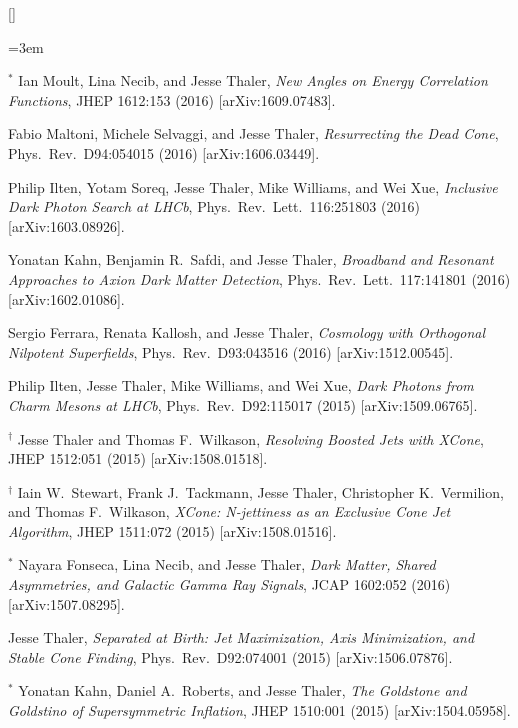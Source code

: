 \begin{list}{[]\addtocounter{jessecount}{-1}}{\leftmargin=3em \itemsep=4pt}
\item
${}^\ast$ Ian Moult, Lina Necib, and Jesse Thaler,
\emph{New Angles on Energy Correlation Functions},
JHEP 1612:153 (2016)
[arXiv:1609.07483].

\item
 Fabio Maltoni, Michele Selvaggi, and Jesse Thaler,
\emph{Resurrecting the Dead Cone},
Phys.\ Rev.\ D94:054015 (2016)
[arXiv:1606.03449].

\item
 Philip Ilten, Yotam Soreq, Jesse Thaler, Mike Williams, and Wei Xue,
\emph{Inclusive Dark Photon Search at LHCb},
Phys.\ Rev.\ Lett.\ 116:251803 (2016)
[arXiv:1603.08926].

\item
 Yonatan Kahn, Benjamin R.\ Safdi, and Jesse Thaler,
\emph{Broadband and Resonant Approaches to Axion Dark Matter Detection},
Phys.\ Rev.\ Lett.\ 117:141801 (2016)
[arXiv:1602.01086].

\item
 Sergio Ferrara, Renata Kallosh, and Jesse Thaler,
\emph{Cosmology with Orthogonal Nilpotent Superfields},
Phys.\ Rev.\ D93:043516 (2016)
[arXiv:1512.00545].

\item
 Philip Ilten, Jesse Thaler, Mike Williams, and Wei Xue,
\emph{Dark Photons from Charm Mesons at LHCb},
Phys.\ Rev.\ D92:115017 (2015)
[arXiv:1509.06765].

\item
${}^\dagger$ Jesse Thaler and Thomas F.\ Wilkason,
\emph{Resolving Boosted Jets with XCone},
JHEP 1512:051 (2015)
[arXiv:1508.01518].

\item
${}^\dagger$ Iain W.\ Stewart, Frank J.\ Tackmann, Jesse Thaler, Christopher K.\ Vermilion, and Thomas F.\ Wilkason,
\emph{XCone: N-jettiness as an Exclusive Cone Jet Algorithm},
JHEP 1511:072 (2015)
[arXiv:1508.01516].

\item
${}^\ast$ Nayara Fonseca, Lina Necib, and Jesse Thaler,
\emph{Dark Matter, Shared Asymmetries, and Galactic Gamma Ray Signals},
JCAP 1602:052 (2016)
[arXiv:1507.08295].

\item
 Jesse Thaler,
\emph{Separated at Birth: Jet Maximization, Axis Minimization, and Stable Cone Finding},
Phys.\ Rev.\ D92:074001 (2015)
[arXiv:1506.07876].

\item
${}^\ast$ Yonatan Kahn, Daniel A.\ Roberts, and Jesse Thaler,
\emph{The Goldstone and Goldstino of Supersymmetric Inflation},
JHEP 1510:001 (2015)
[arXiv:1504.05958].


\end{list}
